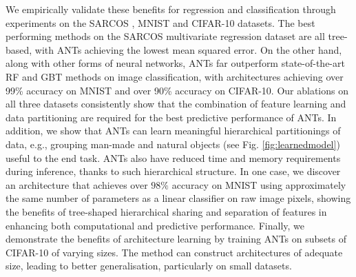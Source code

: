 We empirically validate these benefits for regression and classification through experiments on the SARCOS \cite{vijayakumar2000locally}, MNIST \cite{lecun1998gradient} and CIFAR-10 \cite{krizhevsky2009learning} datasets. The best performing methods on the SARCOS multivariate regression dataset are all tree-based, with ANTs achieving the lowest mean squared error. %
On the other hand, along with other forms of neural networks, ANTs far outperform state-of-the-art RF \cite{zhou2017deepft} and GBT \cite{ponomareva2017compact} methods on image classification, with architectures achieving over 99\% accuracy on MNIST and over 90\% accuracy on CIFAR-10.
Our ablations on all three datasets consistently show that the combination of feature learning and data partitioning are required for the best predictive performance of ANTs. In addition, we show that ANTs can learn meaningful hierarchical partitionings of data, e.g., grouping man-made and natural objects (see Fig. \ref{fig:learnedmodel}) useful to the end task. ANTs also have reduced time and memory requirements during inference, thanks to such hierarchical structure. In one case, we discover an architecture that achieves over $98\%$ accuracy on MNIST using approximately the same number of parameters as a linear classifier on raw image pixels, showing the benefits of tree-shaped hierarchical sharing and separation of features in enhancing both computational and predictive performance. Finally, we demonstrate the benefits of architecture learning by training ANTs on subsets of CIFAR-10 of varying sizes. The method can construct architectures of adequate size, leading to better generalisation, particularly on small datasets.
